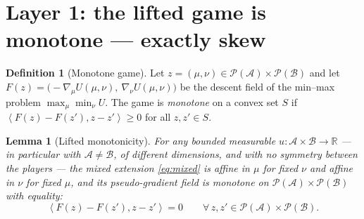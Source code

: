 \documentclass[11pt]{article}
\newtheorem{lemma}{Lemma}
\theoremstyle{definition}
\newtheorem{definition}{Definition}
\newcommand{\R}{\mathbb{R}}
\newcommand{\cA}{\mathcal{A}}
\newcommand{\cB}{\mathcal{B}}
\newcommand{\cP}{\mathcal{P}}
\newcommand{\ip}[2]{\left\langle #1, #2 \right\rangle}
\begin{document}
\section{Layer 1: the lifted game is monotone --- exactly skew}
\label{sec:layer1}

\begin{definition}[Monotone game]
Let $z = (\mu, \nu) \in \cP(\cA) \times \cP(\cB)$ and let
$F(z) = \big({-}\nabla_{\mu} U(\mu,\nu),\ \nabla_{\nu} U(\mu,\nu)\big)$
be the descent field of the min--max problem $\max_\mu \min_\nu U$. The game is
\emph{monotone} on a convex set $S$ if
$\ip{F(z) - F(z')}{z - z'} \ge 0$ for all $z, z' \in S$.
\end{definition}

\begin{lemma}[Lifted monotonicity]\label{lem:lift}
For \emph{any} bounded measurable $u : \cA \times \cB \to \R$ --- in particular
with $\cA \ne \cB$, of different dimensions, and with no symmetry between the
players --- the mixed extension \eqref{eq:mixed} is affine in $\mu$ for fixed
$\nu$ and affine in $\nu$ for fixed $\mu$, and its pseudo-gradient field is
monotone on $\cP(\cA) \times \cP(\cB)$ with equality:
\[
  \ip{F(z) - F(z')}{z - z'} = 0 \qquad
  \forall\, z, z' \in \cP(\cA) \times \cP(\cB) .
\]
\end{lemma}
\end{document}
